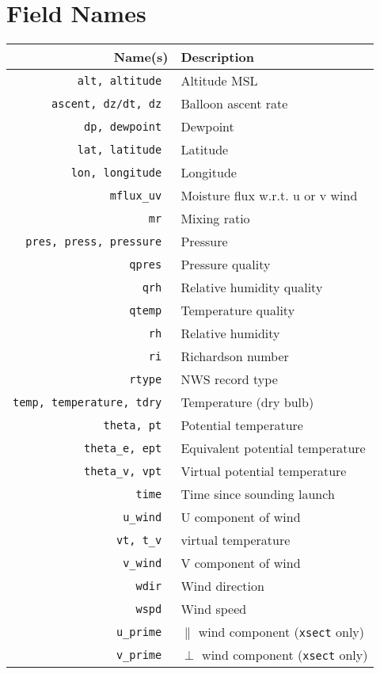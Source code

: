 \part{Field Names}
\label{app-fields}
\begin{center}
\begin{tabular}{|r|l|}
	\hline
	Name(s)				& Description	\\
	\hline \hline
	\tt alt, altitude		& Altitude MSL	\\
	\tt ascent, dz/dt, dz		& Balloon ascent rate \\
	\tt dp, dewpoint		& Dewpoint	\\
	\tt lat, latitude		& Latitude	\\
	\tt lon, longitude		& Longitude	\\
	\tt mflux\_uv			& Moisture flux w.r.t. u or v wind \\
	\tt mr				& Mixing ratio	\\
	\tt pres, press, pressure	& Pressure	\\
	\tt qpres			& Pressure quality	\\
	\tt qrh				& Relative humidity quality	\\
	\tt qtemp			& Temperature quality	\\
	\tt rh				& Relative humidity	\\
	\tt ri				& Richardson number \\
	\tt rtype			& NWS record type	\\
	\tt temp, temperature, tdry	& Temperature (dry bulb)\\
	\tt theta, pt			& Potential temperature	\\
	\tt theta\_e, ept		& Equivalent potential temperature \\
	\tt theta\_v, vpt		& Virtual potential temperature \\
	\tt time			& Time since sounding launch	\\
	\tt u\_wind			& U component of wind	\\
	\tt vt, t\_v			& virtual temperature	\\
	\tt v\_wind			& V component of wind	\\
	\tt wdir			& Wind direction	\\
	\tt wspd			& Wind speed	\\
	\tt u\_prime			& $\parallel$ wind component 
						({\tt xsect} only)	\\
	\tt v\_prime			& $\perp$ wind component 
						({\tt xsect} only)	\\
	\hline
\end{tabular}
\end{center}

